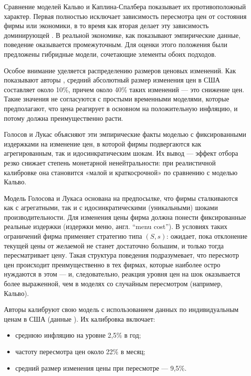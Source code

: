 Сравнение моделей Кальво и Каплина-Спалбера показывает их противоположный характер. Первая полностью исключает зависимость пересмотра цен от состояния фирмы или экономики, в то время как вторая делает эту зависимость доминирующей \cite{caplin1987}. В реальной экономике, как показывают эмпирические данные, поведение оказывается промежуточным. Для оценки этого положения были предложены гибридные модели, сочетающие элементы обоих подходов.

Особое внимание уделяется распределению размеров ценовых изменений. Как показывают авторы \cite{KlenowKryvtsov2008}, средний абсолютный размер изменения цен в США составляет около 10\%, причем около 40\% таких изменений — это снижение цен. Такие значения не согласуются с простыми временными моделями, которые предполагают, что цена реагирует в основном на положительную инфляцию, и потому должна преимущественно расти.

Голосов и Лукас \cite{golosov2007} объясняют эти эмпирические факты моделью с фиксированными издержками на изменение цен, в которой фирмы подвергаются как агрегированным, так и идосинкратическим шокам. Их вывод — эффект отбора резко снижает степень монетарной ненейтральности: при реалистичной калибровке она становится «малой и краткосрочной» по сравнению с моделью Кальво. 

Модель Голосова и Лукаса основана на предпосылке, что фирмы сталкиваются как с агрегатными, так и с идосинкратическими (уникальными) шоками производительности. Для изменения цены фирма должна понести фиксированные реальные издержки (издержки меню, англ. ``menu cost''). В условиях таких ограничений фирма применяет стратегию типа $(S,s)$: ожидает, пока отклонение текущей цены от желаемой не станет достаточно большим, и только тогда пересматривает цену. Такая структура поведения подразумевает, что пересмотр цен происходит преимущественно в тех фирмах, которые наиболее остро нуждаются в этом — и, следовательно, реакция уровня цен на шок оказывается более выраженной, чем в моделях со случайным пересмотром (например, Кальво).

Авторы калибруют свою модель с использованием данных по индивидуальным ценам в США (данные \cite{KlenowKryvtsov2008}). Их калибровка включает:
\begin{itemize}
	\item среднюю инфляцию на уровне 2,5\% в год;
	\item частоту пересмотра цен около 22\% в месяц;
	\item средний размер изменения цены при пересмотре — 9,5\%.
\end{itemize}

